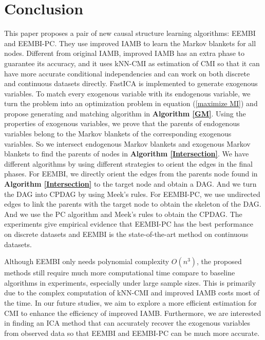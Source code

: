 \documentclass[twoside,11pt]{article}
\begin{document}
\section{Conclusion}

This paper proposes a pair of new causal structure learning algorithms: EEMBI and EEMBI-PC. They use improved IAMB to learn the Markov blankets for all nodes. Different from original IAMB, improved IAMB has an extra phase to guarantee its accuracy, and it uses kNN-CMI as estimation of CMI so that it can have more accurate conditional independencies and can work on both discrete and continuous datasets directly. FastICA is implemented to generate exogenous variables. To match every exogenous variable with its endogenous variable, we turn the problem into an optimization problem in equation (\ref{maximize MI}) and propose generating and matching algorithm in \textbf{Algorithm \ref{GM}}. Using the properties of exogenous variables, we prove that the parents of endogenous variables belong to the Markov blankets of the corresponding exogenous variables. So we intersect endogenous Markov blankets and exogenous Markov blankets to find the parents of nodes in \textbf{Algorithm \ref{Intersection}}. We have different algorithms by using different strategies to orient the edges in the final phases. For EEMBI, we directly orient the edges from the parents node found in \textbf{Algorithm \ref{Intersection}} to the target node and obtain a DAG. And we turn the DAG into CPDAG by using Meek's rules. For EEMBI-PC, we use undirected edges to link the parents with the target node to obtain the skeleton of the DAG. And we use the PC algorithm and Meek's rules to obtain the CPDAG. The experiments give empirical evidence that EEMBI-PC has the best performance on discrete datasets and EEMBI is the state-of-the-art method on continuous datasets.

Although EEMBI only needs polynomial complexity $O(n^3)$, the proposed methods still require much more computational time compare to baseline algorithms in experiments, especially under large sample sizes. This is primarily due to the complex computation of kNN-CMI and improved IAMB costs most of the time. In our future studies, we aim to explore a more efficient estimation for CMI to enhance the efficiency of improved IAMB. Furthermore, we are interested in finding an ICA method that can accurately recover the exogenous variables from observed data so that EEMBI and EEMBI-PC can be much more accurate.

\end{document}
